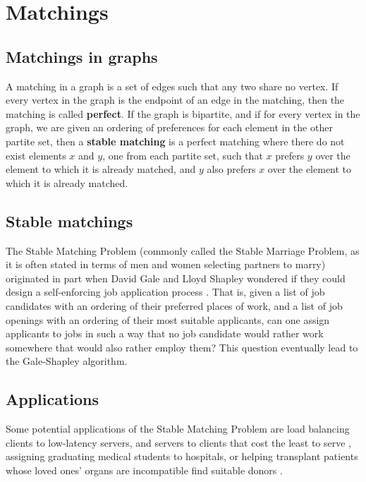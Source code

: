 \documentclass[11pt]{article}
\begin{document}
\section{Matchings}
\subsection{Matchings in graphs}

A matching in a graph is a set of edges such that any two share no vertex.
If every vertex in the graph is the endpoint of an edge in the matching, then the matching is called \textbf{perfect}.
If the graph is bipartite, and if for every vertex in the graph, we are given an ordering of preferences for each element in the other partite set, then a \textbf{stable matching} is a perfect matching where there do not exist elements $x$ and $y$, one from each partite set, such that $x$ prefers $y$ over the element to which it is already matched, and $y$ also prefers $x$ over the element to which it is already matched.



\subsection{Stable matchings}

The Stable Matching Problem (commonly called the Stable Marriage Problem, as it is often stated in terms of men and women selecting partners to marry) originated in part when David Gale and Lloyd Shapley wondered if they could design a self-enforcing job application process \cite{Kleinberg}.
That is, given a list of job candidates with an ordering of their preferred places of work, and a list of job openings with an ordering of their most suitable applicants, can one assign applicants to jobs in such a way that no job candidate would rather work somewhere that would also rather employ them? This question eventually lead to the Gale-Shapley algorithm.


\subsection{Applications}

Some potential applications of the Stable Matching Problem are load balancing clients to low-latency servers, and servers to clients that cost the least to serve \cite{LoadBalance}, assigning graduating medical students to hospitals, or helping transplant patients whose loved ones' organs are incompatible find suitable donors \cite{Kidney}.
\end{document}
